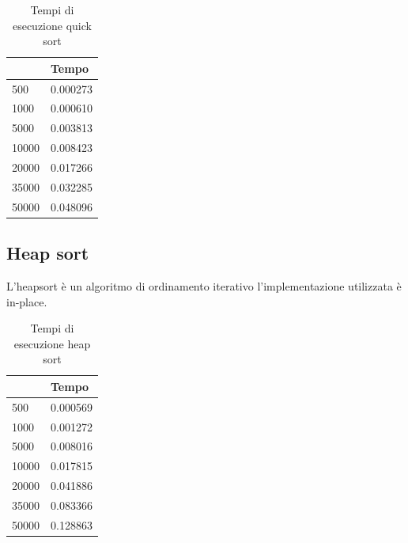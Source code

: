 \documentclass[12pt,a4paper]{report}
\begin{document}
	

\begin{table}[h]
\centering
\begin{tabular}{| l | l  |}
\hline
            & Tempo \\ \hline
500   & 0.000273      \\ \hline
1000  & 0.000610      \\ \hline
5000  & 0.003813     \\ \hline
10000 & 0.008423      \\ \hline
20000 & 0.017266     \\ \hline
35000 & 0.032285     \\ \hline
50000 & 0.048096    \\ \hline

\end{tabular}
\caption{Tempi di esecuzione quick sort}
\label{Tab:Tempi esecuzione QuickSort}
\end{table}

\subsection{Heap sort}
L'heapsort è un algoritmo di ordinamento iterativo l'implementazione utilizzata è in-place.

	

\begin{table}[h]
\centering
\begin{tabular}{| l | l  |}
\hline
            & Tempo \\ \hline
500   & 0.000569      \\ \hline
1000  & 0.001272      \\ \hline
5000  & 0.008016     \\ \hline
10000 & 0.017815      \\ \hline
20000 & 0.041886     \\ \hline
35000 & 0.083366     \\ \hline
50000 & 0.128863    \\ \hline

\end{tabular}
\caption{Tempi di esecuzione heap sort}
\label{Tab:Tempi esecuzione HeapSort}
\end{table}
\end{document}
